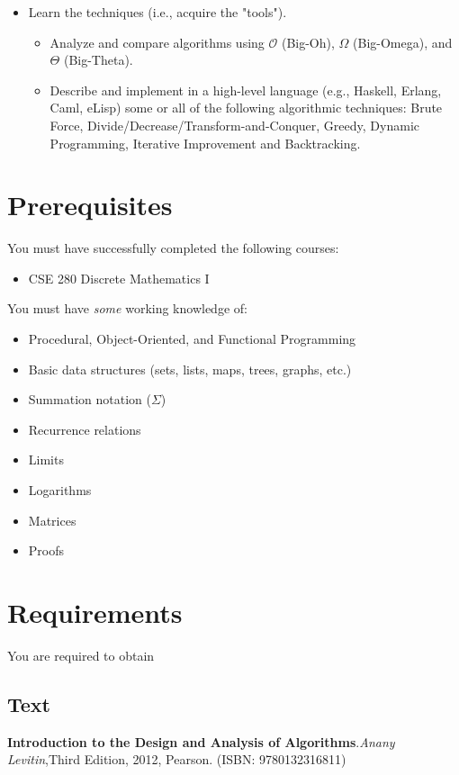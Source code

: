 \documentclass[12pt]{amsart}
\begin{document}
\begin{itemize}
\item Learn the techniques (i.e., acquire the "tools").
	\begin{itemize}
          \item Analyze and compare algorithms using $\mathcal{O}$ (Big-Oh), $\Omega$ (Big-Omega), and
              $\Theta$ (Big-Theta).
          \item Describe and implement in a high-level language (e.g., Haskell, Erlang, Caml, eLisp)
              some or all of the following algorithmic techniques: Brute
              Force, Divide/Decrease/Transform-and-Conquer, Greedy, Dynamic
              Programming, Iterative Improvement and Backtracking.
      	\end{itemize}
\end{itemize}
\section{Prerequisites}

  You must have successfully completed the following courses:
\begin{itemize}
    \item CSE 280 Discrete Mathematics I
\end{itemize}
  You must have \textit{some} working knowledge of:
\begin{itemize}
     \item Procedural, Object-Oriented, and Functional Programming
     \item Basic data structures (sets, lists, maps, trees, graphs, etc.)
     \item Summation notation ($\Sigma$)
     \item Recurrence relations
     \item Limits
     \item Logarithms
     \item Matrices
     \item Proofs
\end{itemize}

\section{Requirements}
You are required to obtain
\subsection{Text} 
	\textbf{Introduction to the Design and Analysis of Algorithms}.\textit{Anany Levitin},Third Edition, 2012, Pearson. (ISBN: 9780132316811)
\end{document}
